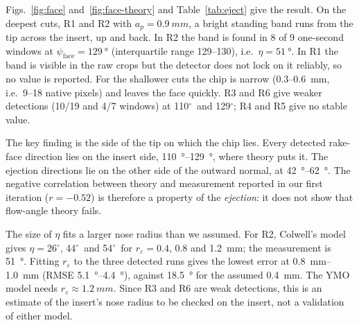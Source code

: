 \documentclass[conference,a4paper]{IEEEtran}
\newcommand{\degr}{\ensuremath{^\circ}}
\begin{document}
Figs.~\ref{fig:face} and~\ref{fig:face-theory} and Table~\ref{tab:eject} give the result.
On the deepest cuts, R1 and R2 with $a_p=\SI{0.9}{mm}$, a bright standing band runs from the tip across the insert, up and back.
In R2 the band is found in 8 of 9 one-second windows at $\psi_\mathrm{face}=\SI{129}{\degree}$ (interquartile range 129--130), i.e.\ $\eta=\SI{51}{\degree}$.
In R1 the band is visible in the raw crops but the detector does not lock on it reliably, so no value is reported.
For the shallower cuts the chip is narrow (0.3--\SI{0.6}{mm}, i.e.\ 9--18 native pixels) and leaves the face quickly.
R3 and R6 give weaker detections (10/19 and 4/7 windows) at 110\degr\ and 129\degr; R4 and R5 give no stable value.

The key finding is the side of the tip on which the chip lies.
Every detected rake-face direction lies on the insert side, \SIrange{110}{129}{\degree}, where theory puts it.
The ejection directions lie on the other side of the outward normal, at \SIrange{42}{62}{\degree}.
The negative correlation between theory and measurement reported in our first iteration (\mbox{$r=-0.52$}) is therefore a property of the \emph{ejection}: it does not show that flow-angle theory fails.

The size of $\eta$ fits a larger nose radius than we assumed.
For R2, Colwell's model gives $\eta=26\degr$, 44\degr\ and 54\degr\ for $r_\varepsilon=0.4$, 0.8 and \SI{1.2}{mm}; the measurement is \SI{51}{\degree}.
Fitting $r_\varepsilon$ to the three detected runs gives the lowest error at \SIrange{0.8}{1.0}{mm} (RMSE \SIrange{5.1}{4.4}{\degree}), against \SI{18.5}{\degree} for the assumed \SI{0.4}{mm}.
The YMO model needs $r_\varepsilon\approx\SI{1.2}{mm}$.
Since R3 and R6 are weak detections, this is an estimate of the insert's nose radius to be checked on the insert, not a validation of either model.
\end{document}
